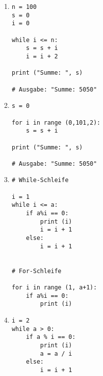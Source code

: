 \begin{enumerate}

\item \begin{lstlisting}[label=KontrollstrukturenSolutionA]
n = 100
s = 0
i = 0

while i <= n:
    s = s + i
    i = i + 2
	
print ("Summe: ", s)

# Ausgabe: "Summe: 5050"
\end{lstlisting} 

\item \begin{lstlisting}[label=KontrollstrukturenSolutionB]	
s = 0

for i in range (0,101,2):
    s = s + i
    
print ("Summe: ", s)

# Ausgabe: "Summe: 5050"
\end{lstlisting} 

\item \begin{lstlisting}[label=KontrollstrukturenSolutionC]	
# While-Schleife

i = 1
while i <= a:
	if a%i == 0:
		print (i)
		i = i + 1
	else:
		i = i + 1


# For-Schleife

for i in range (1, a+1):
	if a%i == 0:
		print (i)
\end{lstlisting} 

\item \begin{lstlisting}[label=KontrollstrukturenSolutionD]	
i = 2
while a > 0:
    if a % i == 0:
        print (i)
        a = a / i
    else: 
        i = i + 1
\end{lstlisting} 

\end{enumerate}